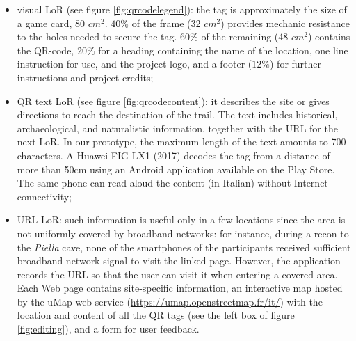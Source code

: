 \documentclass[sustainability,article,submit,pdftex,moreauthors]{Definitions/mdpi}
\begin{document}
\begin{itemize}
    \item visual LoR (see figure \ref{fig:qrcodelegend}): the tag is approximately the size of a game card, 80 $cm^2$. $40\%$ of the frame (32 $cm^2$) provides mechanic resistance to the holes needed to secure the tag. $60\%$ of the remaining (48 $cm^2$) contains the QR-code, $20\%$ for a heading containing the name of the location, one line instruction for use, and the project logo, and a footer ($12\%$) for further instructions and project credits;
    
    \item QR text LoR (see figure \ref{fig:qrcodecontent}): it describes the site or gives directions to reach the destination of the trail. The text includes historical, archaeological, and naturalistic information, together with the URL for the next LoR. In our prototype, the maximum length of the text amounts to 700 characters. A Huawei FIG-LX1 (2017) decodes the tag from a distance of more than 50cm using an Android application available on the Play Store. The same phone can read aloud the content (in Italian) without Internet connectivity;

    \item URL LoR: such information is useful only in a few locations since the area is not uniformly covered by broadband networks: for instance, during a recon to the {\em Piella} cave, none of the smartphones of the participants received sufficient broadband network signal to visit the linked page. However, the application records the URL so that the user can visit it when entering a covered area. Each Web page contains site-specific information, an interactive map hosted by the uMap web service (\url{https://umap.openstreetmap.fr/it/}) with the location and content of all the QR tags (see the left box of figure \ref{fig:editing}), and a form for user feedback.
\end{itemize}
\end{document}
